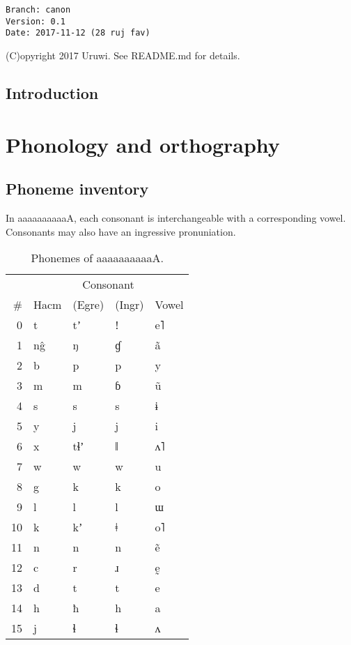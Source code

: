\documentclass{book}
\newcommand{\lname}{aaaaaaaaaaA}
\begin{document}
\begin{verbatim}
Branch: canon
Version: 0.1
Date: 2017-11-12 (28 ruj fav)
\end{verbatim}

(C)opyright 2017 Uruwi. See README.md for details.

\tableofcontents

\section{Introduction}

\chapter{Phonology and orthography}

\section{Phoneme inventory}


In \lname{}, each consonant is interchangeable with a corresponding vowel. Consonants may also have an ingressive pronuniation.

\begin{table}[h]
  \caption{Phonemes of \lname.}
  \centering
  \begin{tabular}{r>{\kardinal}llll}
    & & \multicolumn{2}{c}{Consonant} & \\
    \# & \textnormal{Hacm} & (Egre) & (Ingr) & Vowel \\
    \hline
    0 & t & tʼ & ǃ & e˥ \\
    1 & n\^g & ŋ & ɠ & ã \\
    2 & b & p & p & y \\
    3 & m & m & ɓ & ũ \\
    4 & s & s & s & ɨ \\
    5 & y & j & j & i \\
    6 & x & tɬʼ & ǁ & ʌ˥ \\
    7 & w & w & w & u \\
    8 & g & k & k & o \\
    9 & l & l & l & ɯ \\
    10 & k & kʼ & ǂ & o˥ \\
    11 & n & n & n & ẽ \\
    12 & c & r & ɹ & ḛ \\
    13 & d & t & t & e \\
    14 & h & ħ & h & a \\
    15 & j & ɬ & ɬ & ʌ \\
   \end{tabular}
\end{table}
\end{document}
